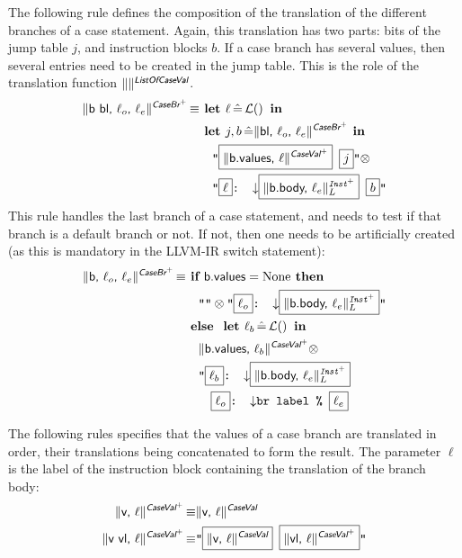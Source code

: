 \documentclass{article}
\newcommand{\trad}[2]{\ensuremath{\lVert \textsf{#1} \rVert^{\textit{#2}}}}
\newcommand{\nl}[0]{\ensuremath{\downarrow}}
\DeclareMathOperator{\isdef}{\equiv}
\DeclareMathOperator{\lbl}{\mathcal{L}()}
\newcommand{\llvm}[1]{\texttt{#1}}
\newcommand{\B}[1]{\textsf{#1}}
\newcommand{\ListOf}[1]{$\mbox{#1}^+$}
\newcommand{\IF}[0]{\textbf{ if }}
\newcommand{\ELSE}[0]{\textbf{ else }}
\newcommand{\THEN}[0]{\textbf{ then }}
\newcommand{\LET}[0]{\textbf{ let }}
\DeclareMathOperator{\BE}{\hat{=}}
\newcommand{\IN}[0]{\textbf{ in }}
\newcommand{\PH}[1]{\framebox{$#1$}}
\newcommand{\sep}[0]{\otimes}
\begin{document}
The following rule defines the composition of the translation of the different
branches of a case statement. Again, this translation has two parts: bits of the
jump table $j$, and instruction blocks $b$. If a case branch has several values,
then several entries need to be created in the jump table. This is the role
of the translation function $\trad{}{\B{ListOf{CaseVal}}}$.
\begin{align*}
  \trad{b bl, $\ell_o$, $\ell_e$}{\ListOf{\B{CaseBr}}} \isdef
  & \LET \ell \BE \lbl \IN \\
  & \LET j, b \BE \trad{bl, $\ell_o$, $\ell_e$}{\ListOf{\B{CaseBr}}} \IN \\
  & \quad \llvm{"\PH{\trad{b.values, $\ell$}{\ListOf{\B{CaseVal}}}} \PH{j}"}
  \sep \\
  & \quad
  \llvm{"\PH{\ell}: \nl \PH{\trad{b.body, $\ell_e$}{\ListOf{Inst}}_L} \PH{b}"}
\end{align*}
This rule handles the last branch of a case statement, and needs to test if
that branch is a default branch or not. If not, then one needs to be artificially
created (as this is mandatory in the LLVM-IR switch statement):
\begin{align*}
  \trad{b, $\ell_o$, $\ell_e$}{\ListOf{\B{CaseBr}}} \isdef
  & \IF \B{b.values} = \text{None} \THEN \\
  & \quad \llvm{""} \sep \llvm{"\PH{\ell_o}: \nl \PH{\trad{b.body, $\ell_e$}{\ListOf{Inst}}_L}"} \\
  & \ELSE \LET \ell_b \BE \lbl \IN \\
  & \quad \trad{b.values, $\ell_b$}{\ListOf{\B{CaseVal}}} \sep \\
  & \quad \llvm{"\PH{\ell_b}: \nl \PH{\trad{b.body, $\ell_e$}{\ListOf{Inst}}_L}} \\
  & \quad \quad \llvm{\PH{\ell_o}: \nl br label \% \PH{\ell_e}}
\end{align*}

The following rules specifies that the values of a case branch are translated in
order, their translations being concatenated to form the result. The parameter
$\ell$ is the label of the instruction block containing the translation of the
branch body:
\begin{align*}
  \trad{v, $\ell$}{\ListOf{\B{CaseVal}}} \isdef & \trad{v, $\ell$}{\B{CaseVal}} \\
  \trad{v vl, $\ell$}{\ListOf{\B{CaseVal}}} \isdef &
  \llvm{"\PH{\trad{v, $\ell$}{\B{CaseVal}}} \PH{\trad{vl, $\ell$}{\ListOf{\B{CaseVal}}}}"}
\end{align*}
\end{document}
